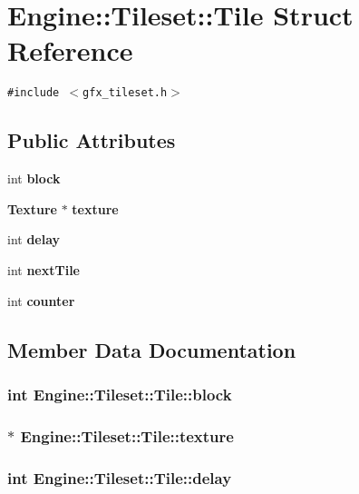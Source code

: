 \section{Engine::Tileset::Tile Struct Reference}
\label{structEngine_1_1Tileset_1_1Tile}
{\tt \#include $<$gfx\_\-tileset.h$>$}

\subsection*{Public Attributes}
\begin{CompactItemize}
\item 
int {\bf block}
\item 
{\bf Texture} $\ast$ {\bf texture}
\item 
int {\bf delay}
\item 
int {\bf nextTile}
\item 
int {\bf counter}
\end{CompactItemize}


\subsection{Member Data Documentation}
\subsubsection{\setlength{\rightskip}{0pt plus 5cm}int {\bf Engine::Tileset::Tile::block}}\label{structEngine_1_1Tileset_1_1Tile_48e7c748db899caa8f32e816cc794950}


\subsubsection{$\ast$ {\bf Engine::Tileset::Tile::texture}}\label{structEngine_1_1Tileset_1_1Tile_42433c3831a3a19c974d065f921d4049}


\subsubsection{\setlength{\rightskip}{0pt plus 5cm}int {\bf Engine::Tileset::Tile::delay}}\label{structEngine_1_1Tileset_1_1Tile_e5115d054fa9a04791810211bddde265}


